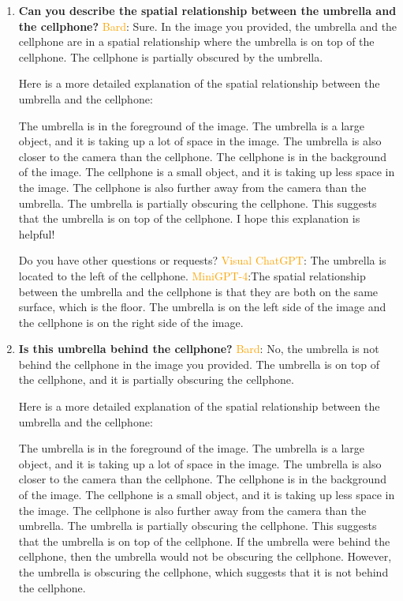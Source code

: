 \begin{enumerate}
    \item \textbf{Can you describe the spatial relationship between the umbrella and the cellphone?}
    \subitem \textcolor{orange}{Bard}: 
    Sure. In the image you provided, the umbrella and the cellphone are in a spatial relationship where the umbrella is on top of the cellphone. The cellphone is partially obscured by the umbrella.
    
    Here is a more detailed explanation of the spatial relationship between the umbrella and the cellphone:
    
    The umbrella is in the foreground of the image. The umbrella is a large object, and it is taking up a lot of space in the image. The umbrella is also closer to the camera than the cellphone.
    The cellphone is in the background of the image. The cellphone is a small object, and it is taking up less space in the image. The cellphone is also further away from the camera than the umbrella.
    The umbrella is partially obscuring the cellphone. This suggests that the umbrella is on top of the cellphone.
    I hope this explanation is helpful!
    
    Do you have other questions or requests?
    \subitem \textcolor{orange}{Visual ChatGPT}: The umbrella is located to the left of the cellphone.
    \subitem \textcolor{orange}{MiniGPT-4}:The spatial relationship between the umbrella and the cellphone is that they are both on the same surface, which is the floor. The umbrella is on the left side of the image and the cellphone is on the right side of the image. 
    \item \textbf{Is this umbrella behind the cellphone?}
    \subitem \textcolor{orange}{Bard}: 
    No, the umbrella is not behind the cellphone in the image you provided. The umbrella is on top of the cellphone, and it is partially obscuring the cellphone.
    
    Here is a more detailed explanation of the spatial relationship between the umbrella and the cellphone:
    
    The umbrella is in the foreground of the image. The umbrella is a large object, and it is taking up a lot of space in the image. The umbrella is also closer to the camera than the cellphone.
    The cellphone is in the background of the image. The cellphone is a small object, and it is taking up less space in the image. The cellphone is also further away from the camera than the umbrella.
    The umbrella is partially obscuring the cellphone. This suggests that the umbrella is on top of the cellphone.
    If the umbrella were behind the cellphone, then the umbrella would not be obscuring the cellphone. However, the umbrella is obscuring the cellphone, which suggests that it is not behind the cellphone.
    

\end{enumerate}
